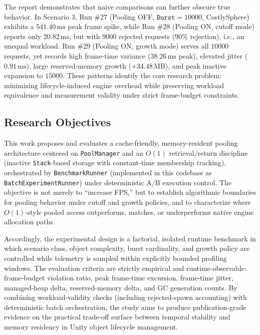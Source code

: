 \documentclass[11pt]{article}
\begin{document}
The report demonstrates that naive comparisons can further obscure true behavior. In Scenario 3, Run \#27 (Pooling OFF, \(\texttt{Burst}=10000\), CostlySphere) exhibits a \(541.40\,\mathrm{ms}\) peak frame spike, while Run \#28 (Pooling ON, cutoff mode) reports only \(20.82\,\mathrm{ms}\), but with \(9000\) rejected requests (\(90\%\) rejection), i.e., an unequal workload. Run \#29 (Pooling ON, growth mode) serves all \(10000\) requests, yet records high frame-time variance (\(38.26\,\mathrm{ms}\) peak), elevated jitter (\(0.91\,\mathrm{ms}\)), large reserved-memory growth (\(+34.48\,\mathrm{MB}\)), and peak inactive expansion to \(15000\). These patterns identify the core research problem: minimizing lifecycle-induced engine overhead while preserving workload equivalence and measurement validity under strict frame-budget constraints.

\subsection{Research Objectives}

This work proposes and evaluates a cache-friendly, memory-resident pooling architecture centered on \texttt{PoolManager} and an \(O(1)\) retrieval/return discipline (inactive \texttt{Stack}-based storage with constant-time membership tracking), orchestrated by \texttt{BenchmarkRunner} (implemented in this codebase as \texttt{BatchExperimentRunner}) under deterministic A/B execution control. The objective is not merely to ``increase FPS,'' but to establish algorithmic boundaries for pooling behavior under cutoff and growth policies, and to characterize where \(O(1)\)-style pooled access outperforms, matches, or underperforms native engine allocation paths.

Accordingly, the experimental design is a factorial, isolated runtime benchmark in which scenario class, object complexity, burst cardinality, and growth policy are controlled while telemetry is sampled within explicitly bounded profiling windows. The evaluation criteria are strictly empirical and runtime-observable: frame-budget violation ratio, peak frame-time excursion, frame-time jitter, managed-heap delta, reserved-memory delta, and GC generation counts. By combining workload-validity checks (including rejected-spawn accounting) with deterministic batch orchestration, the study aims to produce publication-grade evidence on the practical trade-off surface between temporal stability and memory residency in Unity object lifecycle management.
\end{document}
